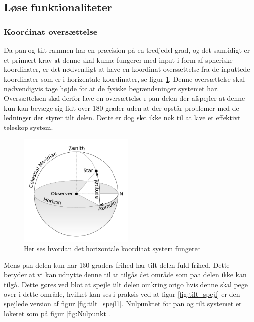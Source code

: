 \subsection{Løse funktionaliteter}

\subsubsection{Koordinat oversættelse}

\label{subsec:koordinat}

Da pan og tilt rammen har en præcision på en tredjedel grad, og det samtidigt er et primært krav at denne skal kunne fungerer med input i form af spheriske koordinater, er det nødvendigt at have en koordinat oversættelse fra de inputtede koordinater som er i horizontale koordinater, se figur \ref{fig:Horizontal}. Denne oversættelse skal nødvendigvis tage højde for at de fysiske begrændsninger systemet har. Oversættelsen skal derfor lave en oversættelse i pan delen der afspejler at denne kun kan bevæge sig lidt over 180 grader uden at der opstår problemer med de ledninger der styrer tilt delen. Dette er dog slet ikke nok til at lave et effektivt teleskop system.
\begin{figure}[!h]
	\begin{center}
		\includegraphics[width=0.5\textwidth]{Billeder/Horizontal.png}
	\end{center}		
	\caption{Her ses hvordan det horizontale koordinat system fungerer}
	\label{fig:Horizontal}
\end{figure}

Mens pan delen kun har 180 graders frihed har tilt delen fuld frihed. Dette betyder at vi kan udnytte denne til at tilgås det område som pan delen ikke kan tilgå. Dette gøres ved blot at spejle tilt delen omkring origo hvis denne skal pege over i dette område, hvilket kan ses i praksis ved at figur \ref{fig:tilt_spejl} er den spejlede version af figur \ref{fig:tilt_spejl1}. Nulpunktet for pan og tilt systemet er lokeret som på figur \ref{fig:Nulpunkt}. 

